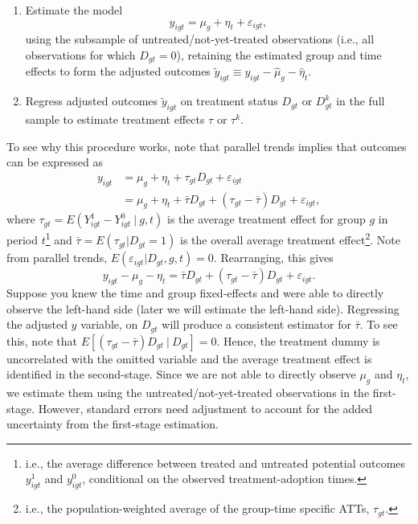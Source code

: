 \begin{enumerate}
\def\labelenumi{\arabic{enumi}.}
\item
  Estimate the model
  \[
   y_{igt} = \mu_g + \eta_t + \varepsilon_{igt},
  \]
  using the subsample of untreated/not-yet-treated observations (i.e., all observations for which \(D_{gt}=0\)), retaining the estimated group and time effects to form the adjusted outcomes \(\tilde{y}_{igt} \equiv y_{igt} - \hat{\mu}_g - \hat{\eta}_t\).
\item
  Regress adjusted outcomes \(\tilde{y}_{igt}\) on treatment status \(D_{gt}\) or \(D_{gt}^k\) in the full sample to estimate treatment effects \(\tau\) or \(\tau^k\).
\end{enumerate}

To see why this procedure works, note that parallel trends implies that outcomes can be expressed as
\begin{align*}
  y_{igt} &= \mu_g + \eta_t + \tau_{gt} D_{gt} + \varepsilon_{igt} \\
  &= \mu_g + \eta_t + \bar{\tau} D_{gt} + (\tau_{gt} - \bar{\tau}) D_{gt} + \varepsilon_{igt},
\end{align*}
where \(\tau_{gt} = E(Y^1_{igt} - Y^0_{igt} \ | \ g, t)\) is the average treatment effect for group \(g\) in period \(t\)\footnote{i.e., the average difference between treated and untreated potential outcomes \(y^1_{igt}\) and \(y^0_{igt}\), conditional on the observed treatment-adoption times.} and \(\bar{\tau} = E(\tau_{gt} | D_{gt}=1)\) is the overall average treatment effect\footnote{i.e., the population-weighted average of the group-time specific ATTs, \(\tau_{gt}\).}. Note from parallel trends, \(E(\varepsilon_{igt} | D_{gt}, g, t) = 0\). Rearranging, this gives
\[
  y_{igt} - \mu_g - \eta_t = \bar{\tau} D_{gt} + (\tau_{gt} - \bar{\tau}) D_{gt} + \varepsilon_{igt}.
\]
Suppose you knew the time and group fixed-effects and were able to directly observe the left-hand side (later we will estimate the left-hand side). Regressing the adjusted \(y\) variable, on \(D_{gt}\) will produce a consistent estimator for \(\bar{\tau}\). To see this, note that \(E[(\tau_{gt} - \bar{\tau}) D_{gt} \ | \ D_{gt}] = 0\). Hence, the treatment dummy is uncorrelated with the omitted variable and the average treatment effect is identified in the second-stage. Since we are not able to directly observe \(\mu_g\) and \(\eta_t\), we estimate them using the untreated/not-yet-treated observations in the first-stage. However, standard errors need adjustment to account for the added uncertainty from the first-stage estimation.

